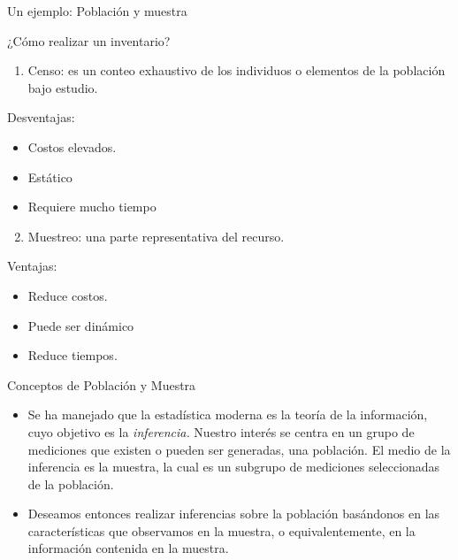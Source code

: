 \documentclass[
  10pt,
  ignorenonframetext,
]{beamer}
\providecommand{\tightlist}{%
  \setlength{\itemsep}{0pt}\setlength{\parskip}{0pt}}
\begin{document}
\begin{frame}{Un ejemplo: Población y muestra}
\protect\hypertarget{un-ejemplo-poblaciuxf3n-y-muestra}{}
\begin{block}{¿Cómo realizar un inventario?}
\protect\hypertarget{cuxf3mo-realizar-un-inventario}{}
\begin{enumerate}
\tightlist
\item
  Censo: es un conteo exhaustivo de los individuos o elementos de la
  población bajo estudio.
\end{enumerate}

Desventajas:

\begin{itemize}
\item
  Costos elevados.
\item
  Estático
\item
  Requiere mucho tiempo
\end{itemize}

\begin{enumerate}
\setcounter{enumi}{1}
\tightlist
\item
  Muestreo: una parte representativa del recurso.
\end{enumerate}

Ventajas:

\begin{itemize}
\item
  Reduce costos.
\item
  Puede ser dinámico
\item
  Reduce tiempos.
\end{itemize}
\end{block}
\end{frame}

\begin{frame}{Conceptos de Población y Muestra}
\protect\hypertarget{conceptos-de-poblaciuxf3n-y-muestra}{}
\begin{itemize}
\item
  Se ha manejado que la estadística moderna es la teoría de la
  información, cuyo objetivo es la \emph{inferencia.} Nuestro interés se
  centra en un grupo de mediciones que existen o pueden ser generadas,
  una población. El medio de la inferencia es la muestra, la cual es un
  subgrupo de mediciones seleccionadas de la población.
\item
  Deseamos entonces realizar inferencias sobre la población basándonos
  en las características que observamos en la muestra, o
  equivalentemente, en la información contenida en la muestra.
\end{itemize}
\end{frame}
\end{document}
